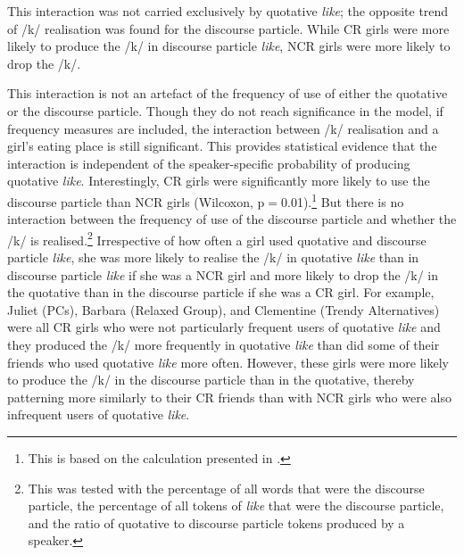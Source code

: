 This interaction was not carried exclusively by quotative \textit{like}; the opposite trend of /k/ realisation was found for the discourse particle. While CR girls were more likely to produce the /k/ in discourse particle \textit{like}, NCR girls were more likely to drop the /k/.

This interaction is not an artefact of the frequency of use of either the quotative or the discourse particle. Though they do not reach significance in the model, if frequency measures are included, the interaction between /k/ realisation and a girl's eating place is still significant. This provides statistical evidence that the interaction is independent of the speaker-specific probability of producing quotative \textit{like}. Interestingly, CR girls were significantly more likely to use the discourse particle than NCR girls (Wilcoxon, p$=$0.01).\footnote{This is based on the calculation presented in .} But there is no interaction between the frequency of use of the discourse particle and whether the /k/ is realised.\footnote{This was tested with the percentage of all words that were the discourse particle, the percentage of all tokens of \textit{like} that were the discourse particle, and the ratio of quotative to discourse particle tokens produced by a speaker.} Irrespective of how often a girl used quotative and discourse particle \textit{like}, she was more likely to realise the /k/ in quotative \textit{like} than in discourse particle \textit{like} if she was a NCR girl and more likely to drop the /k/ in the quotative than in the discourse particle if she was a CR girl. For example, Juliet (PCs), Barbara (Relaxed Group), and Clementine (Trendy Alternatives) were all CR girls who were not particularly frequent users of quotative \textit{like} and they produced the /k/ more frequently in quotative \textit{like} than did some of their friends who used quotative \textit{like} more often. However, these girls were more likely to produce the /k/ in the discourse particle than in the quotative, thereby patterning more similarly to their CR friends than with NCR girls who were also infrequent users of quotative \textit{like}. 







